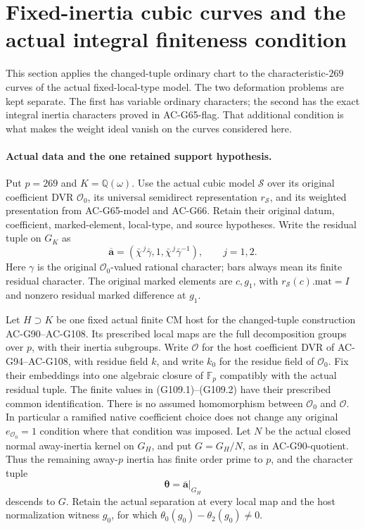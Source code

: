 \section{Fixed-inertia cubic curves and the actual integral finiteness condition}
\label{sec:cubic-fixed-weight-curve-m2}

This section applies the changed-tuple ordinary chart to the
characteristic-\(269\) curves of the actual fixed-local-type model.
The two deformation problems are kept separate.  The first has
variable ordinary characters; the second has the exact integral
inertia characters proved in AC-G65-flag.  That additional condition
is what makes the weight ideal vanish on the curves considered here.

\paragraph{Actual data and the one retained support hypothesis.}
Put \(p=269\) and \(K=\mathbb Q(\omega)\).  Use the actual cubic
model \(\mathscr S\) over its original coefficient DVR
\(\mathcal O_0\), its universal semidirect representation
\(r_{\mathscr S}\), and its weighted presentation from AC-G65-model
and AC-G66.  Retain their original datum, coefficient, marked-element,
local-type, and source hypotheses.  Write the residual tuple on
\(G_K\) as
\[
 \overline{\boldsymbol a}
   =(\bar\chi^{\,j}\bar\gamma,1,
                  \bar\chi^{\,j}\bar\gamma^{-1}),\qquad j=1,2.
 \tag{G109.1}
\]
Here \(\gamma\) is the original \(\mathcal O_0\)-valued rational
character; bars always mean its finite residual character.
The original marked elements are \(c,g_1\), with
\(r_{\mathscr S}(c).\mathrm{mat}=I\) and nonzero residual marked
difference at \(g_1\).

Let \(H\supset K\) be one fixed actual finite CM host for the
changed-tuple construction AC-G90--AC-G108.  Its prescribed local
maps are the full decomposition groups over \(p\), with their
inertia subgroups.  Write \(\mathcal O\) for the host coefficient
DVR of AC-G94--AC-G108, with residue field \(k\), and write
\(k_0\) for the residue field of \(\mathcal O_0\).
Fix their embeddings into one algebraic closure of \(\mathbb F_p\)
compatibly with the actual residual tuple.  The finite values
in (G109.1)--(G109.2) have their prescribed common identification.
There is no assumed homomorphism between \(\mathcal O_0\) and
\(\mathcal O\).  In particular a ramified native coefficient
choice does not change any original \(e_{\mathcal O_0}=1\)
condition where that condition was imposed.
Let \(N\) be the actual closed normal away-inertia kernel on
\(G_H\), and put \(G=G_H/N\), as in AC-G90-quotient.  Thus the
remaining away-\(p\) inertia has finite order prime to \(p\),
and the character tuple
\[
 \boldsymbol\theta
       =\overline{\boldsymbol a}|_{G_H}
 \tag{G109.2}
\]
descends to \(G\).  Retain the actual separation at every local
map and the host normalization witness \(g_0\), for which
\(\theta_0(g_0)-\theta_2(g_0)\ne0\).

